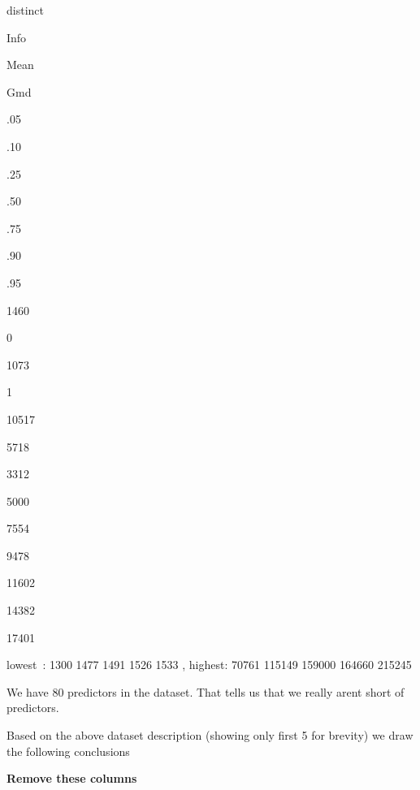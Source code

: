 \documentclass[
]{article}
\begin{document}
distinct

Info

Mean

Gmd

.05

.10

.25

.50

.75

.90

.95

1460

0

1073

1

10517

5718

3312

5000

7554

9478

11602

14382

17401

{lowest~: 1300 1477 1491 1526 1533 , highest: 70761 115149 159000 164660 215245}

We have 80 predictors in the dataset. That tells us that we really arent short of predictors.

Based on the above dataset description (showing only first 5 for brevity) we draw the following conclusions

\textbf{Remove these columns}
\end{document}
